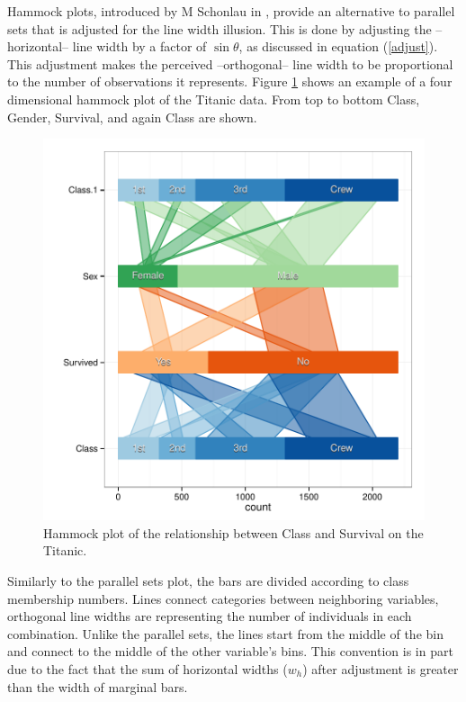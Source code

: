 Hammock plots, introduced by M Schonlau in \cite{schonlau:2003}, provide an alternative to parallel sets that is adjusted for the line width illusion. This is done by  adjusting the --horizontal-- line width by  a factor of $\sin \theta$, as discussed in equation (\ref{adjust}). This adjustment makes the perceived --orthogonal-- line width to be proportional to the number of observations it represents. 
 Figure \ref{hammock} shows an example of a four dimensional hammock plot of the Titanic data. From top to bottom Class, Gender, Survival, and again Class are shown. 
\begin{figure}
\centering
\includegraphics[width=\linewidth]{images/hammock-titanic}
\caption{\label{hammock} Hammock plot of the relationship between Class and Survival on the Titanic. }
\end{figure}

Similarly to the parallel sets plot, the bars are divided according to class membership numbers.  Lines connect categories between neighboring variables, orthogonal line widths are representing the number of individuals in each combination. Unlike the parallel sets, the lines start from the middle of the bin and connect to the middle of the other variable's bins. This convention is in part due to the fact that the sum of  horizontal widths ($w_h$) after adjustment is greater than the width of marginal bars.


